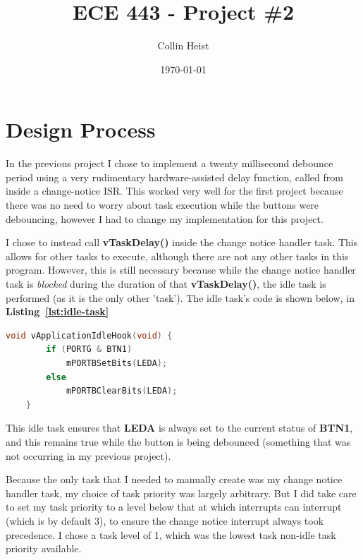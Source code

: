 \documentclass[a4paper, 12pt]{article}
\begin{document}
\title{ECE 443 - Project \#2}
\author{Collin Heist}
\date{\today}
\maketitle
{}
\tableofcontents
\lstlistoflistings
\newpage
{}

\section{Design Process}
In the previous project I chose to implement a twenty millisecond debounce period using a very rudimentary hardware-assisted delay function, called from inside a change-notice ISR. This worked very well for the first project because there was no need to worry about task execution while the buttons were debouncing, however I had to change my implementation for this project.

I chose to instead call \textbf{vTaskDelay()} inside the change notice handler task. This allows for other tasks to execute, although there are not any other tasks in this program. However, this is still necessary because while the change notice handler task is \emph{blocked} during the duration of that \textbf{vTaskDelay()}, the idle task is performed (as it is the only other 'task'). The idle task's code is shown below, in \textbf{Listing~\ref{lst:idle-task}}

	\begin{mdframed}[backgroundcolor=code-gray, roundcorner=10pt,
								innerleftmargin=5, innertopmargin=5, innerbottommargin=5]	
	\begin{lstlisting}[language=C, caption=Idle Task, tabsize=2, label={lst:idle-task}]
	void vApplicationIdleHook(void) {
		if (PORTG & BTN1)
			mPORTBSetBits(LEDA);
		else
			mPORTBClearBits(LEDA);
	}
	\end{lstlisting}
	\end{mdframed}
	
This idle task ensures that \textbf{LEDA} is always set to the current status of \textbf{BTN1}, and this remains true while the button is being debounced (something that was not occurring in my previous project).

Because the only task that I needed to manually create was my change notice handler task, my choice of task priority was largely arbitrary. But I did take care to set my task priority to a level below that at which interrupts can interrupt (which is by default 3), to ensure the change notice interrupt always took precedence. I chose a task level of 1, which was the lowest task non-idle task priority available.
\end{document}
